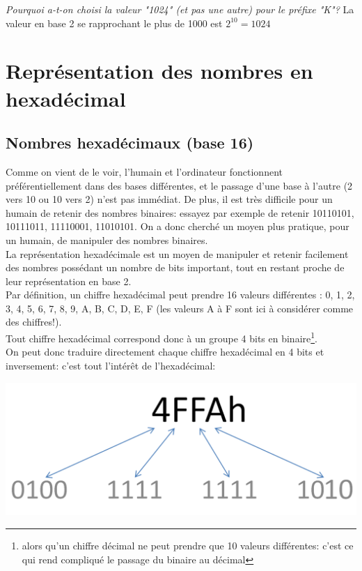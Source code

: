 {
\textit{Pourquoi a-t-on choisi la valeur "1024" (et pas une autre) pour le préfixe "K"?}
}
{%
La valeur en base 2 se rapprochant le plus de 1000 est $2^{10} = 1024$
}

\section{Représentation des nombres en hexadécimal}

\subsection{Nombres hexadécimaux (base 16)}
Comme on vient de le voir, l'humain et l'ordinateur fonctionnent préférentiellement dans des bases différentes, et le passage d'une base à l'autre (2 vers 10 ou 10 vers 2) n'est pas immédiat. De plus, il est très difficile pour un humain de retenir des nombres binaires: essayez par exemple de retenir 10110101, 10111011, 11110001, 11010101. On a donc cherché un moyen plus pratique, pour un humain, de manipuler des nombres binaires.\\

La représentation hexadécimale est un moyen de manipuler et retenir facilement des nombres possédant un nombre de bits important, tout en restant proche de leur représentation en base 2.\\

Par définition, un chiffre hexadécimal peut prendre 16 valeurs différentes : 0, 1, 2, 3, 4, 5, 6, 7, 8, 9, A, B, C, D, E, F (les valeurs A à F sont ici à considérer comme des chiffres!).\\

Tout chiffre hexadécimal correspond donc à un groupe 4 bits en binaire\footnote{alors qu'un chiffre décimal ne peut prendre que 10 valeurs différentes: c'est ce qui rend compliqué le passage du binaire au décimal}.\\

On peut donc traduire directement chaque chiffre hexadécimal en 4 bits et inversement: c'est tout l'intérêt de l'hexadécimal:
\begin{center}
\includegraphics[scale=0.25]{Labo3_4FFA.PNG}
\end{center}

